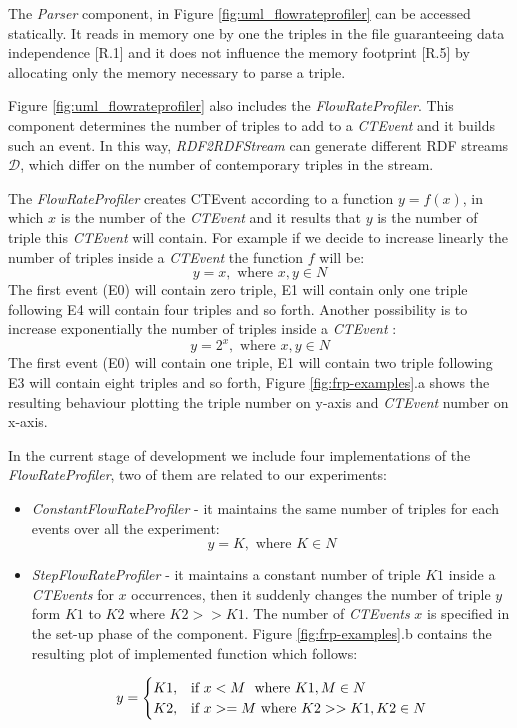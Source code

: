 The \textit{Parser} component, in Figure \ref{fig:uml_flowrateprofiler} can be accessed statically. It reads in memory one by one the triples in the file guaranteeing data independence [R.1] and it does not influence the memory footprint [R.5] by allocating only the memory necessary to parse a triple. 

Figure \ref{fig:uml_flowrateprofiler} also includes the \textit{FlowRateProfiler}. This component determines the number of triples to add to a \textit{CTEvent} and it builds such an event. In this way, \textit{RDF2RDFStream} can generate different RDF streams $\mathcal{D}$, which differ on the number of contemporary triples in the stream. 



The \textit{FlowRateProfiler} creates CTEvent according to a function $y=f(x)$, in which $x$ is the number of the \textit{CTEvent} and it results that $y$ is the number of triple this \textit{CTEvent} will contain. For example if we decide to increase linearly the number of triples inside a \textit{CTEvent} the function $f$ will be: \[y=x, \text{ where } x,y \in N\]
The first event (E0) will contain zero triple, E1 will contain only one triple following E4 will contain four triples and so forth. Another possibility is to increase exponentially the number of triples inside a \textit{CTEvent} : \[y=2^x, \text{ where } x,y \in N\]The first event (E0) will contain one triple, E1 will contain two triple following E3 will contain eight triples and so forth, Figure \ref{fig:frp-examples}.a shows the resulting behaviour plotting the triple number on y-axis and \textit{CTEvent} number on x-axis.

In the current stage of development we include four implementations of the \textit{FlowRateProfiler}, two of them are related to our experiments: 
\begin{itemize}
\item \textit{ConstantFlowRateProfiler} - it maintains the same number of triples for each events over all the experiment: \\
\[y=K, \text{ where } K \in N \]

\item \textit{StepFlowRateProfiler} - it maintains a constant number of triple $K1$ inside a \textit{CTEvents} for $x$ occurrences, then it suddenly changes the number of triple $y$ form $K1$ to $K2$ where $K2 >> K1$. The number of  \textit{CTEvents} $x$ is specified in the set-up phase of the component.  Figure \ref{fig:frp-examples}.b contains the resulting plot of implemented function which follows:

\[
y=
\begin{cases}
K1, &\text{if $x < M$ } $ where $ K1, M \in N\\
K2, &\text{if $x >= M$} $ where $ K2 >> K1, K2 \in N
\end{cases}
\]


\end{itemize}

